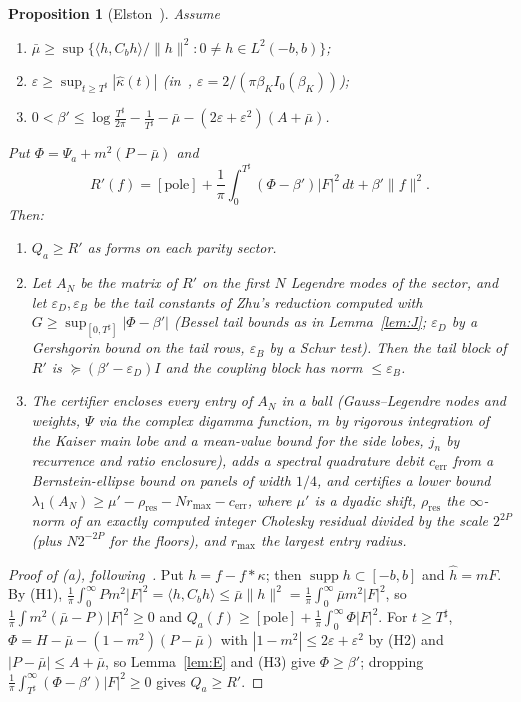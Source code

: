 \documentclass[11pt]{amsart}
\newcommand{\pole}{\mathrm{pole}}
\newcommand{\Tsh}{T^{\sharp}}
\newcommand{\eps}{\varepsilon}
\newtheorem{proposition}[theorem]{Proposition}
\theoremstyle{definition}
\theoremstyle{remark}
\numberwithin{equation}{section}
\begin{document}
\begin{proposition}[Elston~\cite{Elston}]\label{prop:elston}
Assume
\begin{enumerate}
\item[(H1)] $\bar\mu\ge\sup\{\langle h,C_bh\rangle/\|h\|^2:0\ne h\in L^2(-b,b)\}$;
\item[(H2)] $\eps\ge\sup_{t\ge\Tsh}|\hat\kappa(t)|$ (in~\cite{Elston}, $\eps=2/(\pi\beta_KI_0(\beta_K))$);
\item[(H3)] $0<\beta'\le\log\frac{\Tsh}{2\pi}-\frac1{\Tsh}-\bar\mu-(2\eps+\eps^2)(A+\bar\mu)$.
\end{enumerate}
Put $\Phi=\Psi_a+m^2(P-\bar\mu)$ and
\[
R'(f)=[\pole]+\frac1\pi\int_0^{\Tsh}(\Phi-\beta')|F|^2\,dt+\beta'\|f\|^2.
\]
Then:
\begin{enumerate}
\item[(a)] $Q_a\ge R'$ as forms on each parity sector.
\item[(b)] Let $A_N$ be the matrix of $R'$ on the first $N$ Legendre modes of the sector, and let $\eps_D,\eps_B$ be the tail constants of Zhu's reduction computed with $G\ge\sup_{[0,\Tsh]}|\Phi-\beta'|$ (Bessel tail bounds as in Lemma~\ref{lem:J}; $\eps_D$ by a Gershgorin bound on the tail rows, $\eps_B$ by a Schur test). Then the tail block of $R'$ is $\succeq(\beta'-\eps_D)I$ and the coupling block has norm $\le\eps_B$.
\item[(c)] The certifier encloses every entry of $A_N$ in a ball (Gauss--Legendre nodes and weights, $\Psi$ via the complex digamma function, $m$ by rigorous integration of the Kaiser main lobe and a mean-value bound for the side lobes, $j_n$ by recurrence and ratio enclosure), adds a spectral quadrature debit $c_{\mathrm{err}}$ from a Bernstein-ellipse bound on panels of width $1/4$, and certifies a lower bound $\lambda_1(A_N)\ge\mu'-\rho_{\mathrm{res}}-N r_{\max}-c_{\mathrm{err}}$, where $\mu'$ is a dyadic shift, $\rho_{\mathrm{res}}$ the $\infty$-norm of an exactly computed integer Cholesky residual divided by the scale $2^{2P}$ (plus $N2^{-2P}$ for the floors), and $r_{\max}$ the largest entry radius.
\end{enumerate}
\end{proposition}
\begin{proof}[Proof of (a), following~\cite{Elston}]
Put $h=f-f*\kappa$; then $\operatorname{supp}h\subset[-b,b]$ and $\hat h=mF$. By (H1), $\frac1\pi\int_0^\infty Pm^2|F|^2=\langle h,C_bh\rangle\le\bar\mu\|h\|^2=\frac1\pi\int_0^\infty\bar\mu m^2|F|^2$, so $\frac1\pi\int m^2(\bar\mu-P)|F|^2\ge0$ and $Q_a(f)\ge[\pole]+\frac1\pi\int_0^\infty\Phi|F|^2$. For $t\ge\Tsh$, $\Phi=H-\bar\mu-(1-m^2)(P-\bar\mu)$ with $|1-m^2|\le2\eps+\eps^2$ by (H2) and $|P-\bar\mu|\le A+\bar\mu$, so Lemma~\ref{lem:E} and (H3) give $\Phi\ge\beta'$; dropping $\frac1\pi\int_{\Tsh}^\infty(\Phi-\beta')|F|^2\ge0$ gives $Q_a\ge R'$.
\end{proof}
\end{document}
